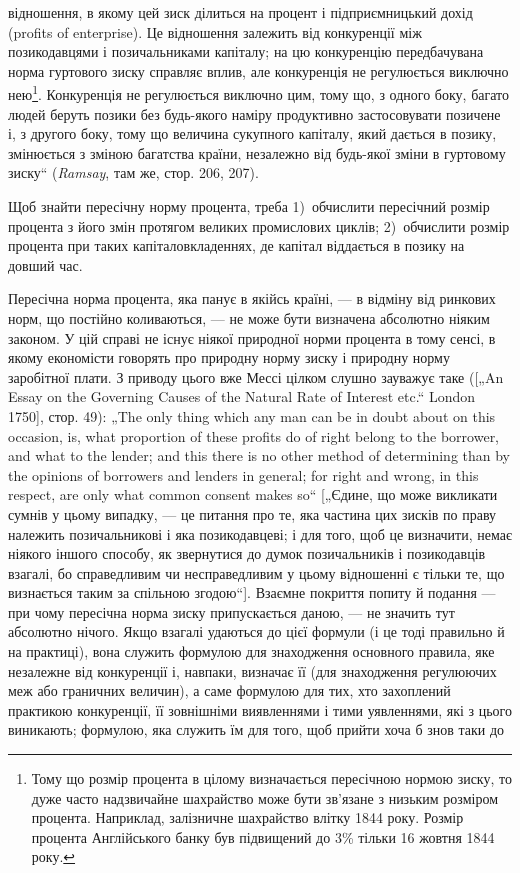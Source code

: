 \parcont{}  %
відношення, в якому цей зиск ділиться на процент і підприємницький
дохід (profits of enterprise). Це відношення залежить
від конкуренції між позикодавцями і позичальниками капіталу;
на цю конкуренцію передбачувана норма гуртового зиску
справляє вплив, але конкуренція не регулюється виключно нею\footnote{
Тому що розмір процента в цілому визначається пересічною нормою
зиску, то дуже часто надзвичайне шахрайство може бути зв’язане з низьким
розміром процента. Наприклад, залізничне шахрайство влітку 1844 року. Розмір
процента Англійського банку був підвищений до 3\% тільки 16 жовтня
1844 року.
}.
Конкуренція не регулюється виключно цим, тому що, з одного
боку, багато людей беруть позики без будь-якого наміру продуктивно
застосовувати позичене і, з другого боку, тому що величина
сукупного капіталу, який дається в позику, змінюється з зміною
багатства країни, незалежно від будь-якої зміни в гуртовому
зиску“ (\emph{Ramsay}, там же, стор. 206, 207).

Щоб знайти пересічну норму процента, треба 1)~обчислити
пересічний розмір процента з його змін протягом великих промислових
циклів; 2)~обчислити розмір процента при таких капіталовкладеннях,
де капітал віддається в позику на довший час.

Пересічна норма процента, яка панує в якійсь країні, — в відміну
від ринкових норм, що постійно коливаються, — не може бути
визначена абсолютно ніяким законом. У цій справі не існує ніякої
природної норми процента в тому сенсі, в якому економісти
говорять про природну норму зиску і природну норму заробітної
плати. З приводу цього вже Мессі цілком слушно зауважує
таке ([„An Essay on the Governing Causes of the Natural Rate of Interest
etc.“ London 1750], стор. 49): „The only thing which any man can
be in doubt about on this occasion, is, what proportion of these profits
do of right belong to the borrower, and what to the lender; and this there
is no other method of determining than by the opinions of borrowers
and lenders in general; for right and wrong, in this respect, are
only what common consent makes so“ [„Єдине, що може викликати
сумнів у цьому випадку, — це питання про те, яка частина цих
зисків по праву належить позичальникові і яка позикодавцеві;
і для того, щоб це визначити, немає ніякого іншого способу, як
звернутися до думок позичальників і позикодавців взагалі, бо
справедливим чи несправедливим у цьому відношенні є тільки те,
що визнається таким за спільною згодою“]. Взаємне покриття
попиту й подання — при чому пересічна норма зиску припускається
даною, — не значить тут абсолютно нічого. Якщо взагалі
удаються до цієї формули (і це тоді правильно й на практиці),
вона служить формулою для знаходження основного правила,
яке незалежне від конкуренції і, навпаки, визначає її (для знаходження
регулюючих меж або граничних величин), а саме формулою
для тих, хто захоплений практикою конкуренції, її зовнішніми
виявленнями і тими уявленнями, які з цього виникають; формулою,
яка служить їм для того, щоб прийти хоча б знов таки до
\parbreak{}  %
